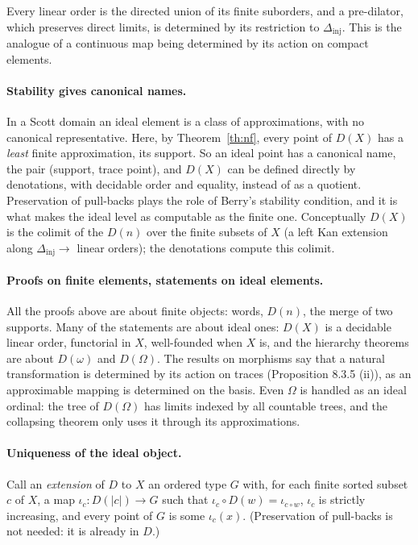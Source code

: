 \documentclass[11pt,a4paper]{article}
\theoremstyle{definition}
\theoremstyle{remark}
\newcommand{\Dinj}{\Delta_{\mathrm{inj}}}
\begin{document}
\medskip
Every linear order is the directed union of its finite suborders, and a
pre-dilator, which preserves direct limits, is determined by its
restriction to $\Dinj$. This is the analogue of a continuous map being
determined by its action on compact elements.

\paragraph{Stability gives canonical names.}
In a Scott domain an ideal element is a class of approximations, with no
canonical representative. Here, by Theorem~\ref{th:nf}, every point of
$D(X)$ has a \emph{least} finite approximation, its support. So an ideal
point has a canonical name, the pair (support, trace point), and $D(X)$
can be defined directly by denotations, with decidable order and
equality, instead of as a quotient. Preservation of pull-backs plays the
role of Berry's stability condition, and it is what makes the ideal level
as computable as the finite one. Conceptually $D(X)$ is the colimit of the
$D(n)$ over the finite subsets of $X$ (a left Kan extension along
$\Dinj \to$ linear orders); the denotations compute this colimit.

\paragraph{Proofs on finite elements, statements on ideal elements.}
All the proofs above are about finite objects: words, $D(n)$, the merge
of two supports. Many of the statements are about ideal ones: $D(X)$ is a
decidable linear order, functorial in $X$, well-founded when $X$ is, and
the hierarchy theorems are about $D(\omega)$ and $D(\Omega)$. The results
on morphisms say that a natural transformation is determined by its action
on traces (Proposition 8.3.5 (ii)), as an approximable mapping is
determined on the basis. Even $\Omega$ is handled as an ideal ordinal: the
tree of $D(\Omega)$ has limits indexed by all countable trees, and the
collapsing theorem only uses it through its approximations.

\paragraph{Uniqueness of the ideal object.}
Call an \emph{extension} of $D$ to $X$ an ordered type $G$ with, for each
finite sorted subset $c$ of $X$, a map $\iota_c : D(|c|) \to G$ such that
$\iota_c \circ D(w) = \iota_{c \circ w}$, $\iota_c$ is strictly increasing,
and every point of $G$ is some $\iota_c(x)$. (Preservation of pull-backs
is not needed: it is already in $D$.)
\end{document}
